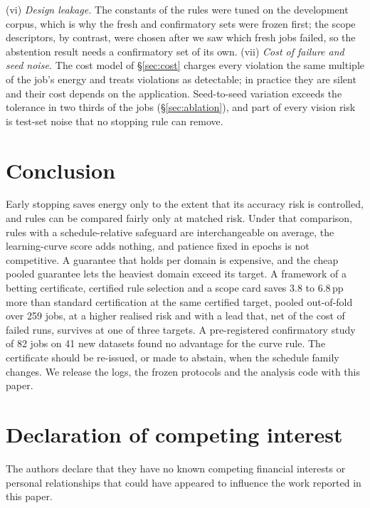 \documentclass[3p,twocolumn,10pt]{elsarticle}
\theoremstyle{definition}
\begin{document}
(vi) \emph{Design leakage.} The constants of the rules were tuned on the development corpus, which is why the fresh and confirmatory sets were frozen first; the scope descriptors, by contrast, were chosen after we saw which fresh jobs failed, so the abstention result needs a confirmatory set of its own.
(vii) \emph{Cost of failure and seed noise.} The cost model of \S\ref{sec:cost} charges every violation the same multiple of the job's energy and treats violations as detectable; in practice they are silent and their cost depends on the application. Seed-to-seed variation exceeds the tolerance in two thirds of the jobs (\S\ref{sec:ablation}), and part of every vision risk is test-set noise that no stopping rule can remove.

\section{Conclusion}
\label{sec:conclusion}
Early stopping saves energy only to the extent that its accuracy risk is controlled, and rules can be compared fairly only at matched risk. Under that comparison, rules with a schedule-relative safeguard are interchangeable on average, the learning-curve score adds nothing, and patience fixed in epochs is not competitive. A guarantee that holds per domain is expensive, and the cheap pooled guarantee lets the heaviest domain exceed its target. A framework of a betting certificate, certified rule selection and a scope card saves 3.8 to 6.8\,pp more than standard certification at the same certified target, pooled out-of-fold over 259 jobs, at a higher realised risk and with a lead that, net of the cost of failed runs, survives at one of three targets. A pre-registered confirmatory study of 82 jobs on 41 new datasets found no advantage for the curve rule. The certificate should be re-issued, or made to abstain, when the schedule family changes. We release the logs, the frozen protocols and the analysis code with this paper.

\section*{Declaration of competing interest}
The authors declare that they have no known competing financial interests or personal relationships that could have appeared to influence the work reported in this paper.
\end{document}

